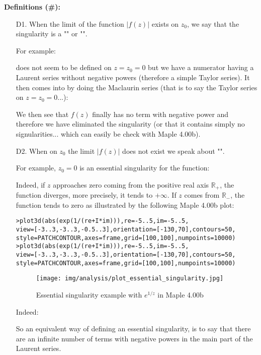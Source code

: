 	\textbf{Definitions (\#\mydef):}
	\begin{enumerate}
		\item[D1.] When the limit of the function $\vert f(z) \vert$ exists on $z_0$, we say that the singularity is a "" or "".
		
		For example:
		
		does not seem to be defined on $z=z_0=0$ but we have a numerator having a Laurent series without negative powers (therefore a simple Taylor series). It then comes into by doing the Maclaurin series (that is to say the Taylor series on $z=z_0=0$...):
		
		We then see that $f (z)$ finally has no term with negative power and therefore we have eliminated the singularity (or that it contains simply no signularities... which can easily be check with Maple 4.00b).
		
		\item[D2.] When on $z_0$ the limit $\vert f(z) \vert $ does not exist we speak about "".
		
		For example, $z_0=0$ is an essential singularity for the function:
		
		Indeed, if $z$ approaches zero coming from the positive real axis $\mathbb{R}_+$, the function diverges, more precisely, it tends to $+\infty$. If $z$ comes from $\mathbb{R}_-$, the function tends to zero as illustrated by the following Maple 4.00b plot:
		
		
		\texttt{>plot3d(abs(exp(1/(re+I*im))),re=-5..5,im=-5..5,\\
		view=[-3..3,-3..3,-0.5..3],orientation=[-130,70],contours=50,\\
		style=PATCHCONTOUR,axes=frame,grid=[100,100],numpoints=10000)\\
		>plot3d(abs(exp(1/(re+I*im))),re=-5..5,im=-5..5,\\
		view=[-3..3,-3..3,-0.5..3],orientation=[-130,70],contours=50,\\
		style=PATCHCONTOUR,axes=frame,grid=[100,100],numpoints=10000)}
		\begin{figure}[H]
			\centering
			\texttt{[image: img/analysis/plot\_essential\_singularity.jpg]}
			\caption{Essential singularity example with $e^{1/z}$ in Maple 4.00b}
		\end{figure}
		Indeed:
		
		So an equivalent way of defining an essential singularity, is to say that there are an infinite number of terms with negative powers in the main part of the Laurent series.
		

\end{enumerate}
